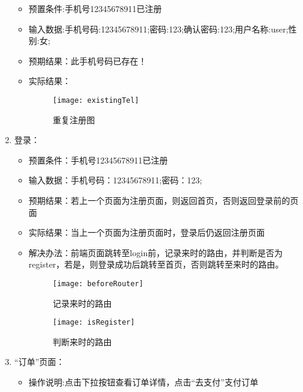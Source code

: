 \begin{enumerate}
\begin{itemize}
              \item{预置条件}:手机号12345678911已注册
              \item{输入数据}:手机号码:12345678911;密码:123;确认密码:123;用户名称:user;性别:女;
        \item {预期结果}：此手机号码已存在！
        \item {实际结果}：
              \begin{figure}[htbp]
                  \centering
                  \texttt{[image: existingTel]}
                  \caption{重复注册图}\label{fig:existingTel}
              \end{figure}
    \end{itemize}
    \item {登录}：
          \begin{itemize}
              \item{预置条件}：手机号12345678911已注册
              \item{输入数据}：手机号码：12345678911;密码：123;
              \item{预期结果}：若上一个页面为注册页面，则返回首页，否则返回登录前的页面
              \item{实际结果}：当上一个页面为注册页面时，登录后仍返回注册页面
              \item{解决办法}：前端页面跳转至login前，记录来时的路由，并判断是否为register，若是，则登录成功后跳转至首页，否则跳转至来时的路由。
              \begin{figure}[htbp]
                  \centering
                  \begin{minipage}{0.4\textwidth}
                      \centering
                      \texttt{[image: beforeRouter]}
                      \caption{记录来时的路由}\label{fig:beforeRouter}
                  \end{minipage}
                  \begin{minipage}{0.4\textwidth}
                      \centering
                      \texttt{[image: isRegister]}
                      \caption{判断来时的路由}\label{fig:isRegister}
                  \end{minipage}                 
              \end{figure}
          \end{itemize}
    \item {“订单”页面}：
          \begin{itemize}
              \item{操作说明}:点击下拉按钮查看订单详情，点击“去支付”支付订单

\end{itemize}
\end{enumerate}
